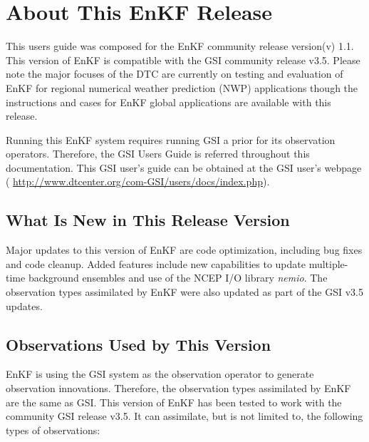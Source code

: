 \section{About This EnKF Release}

This user\textquotesingle s guide was composed for the EnKF community release version(v) 1.1. This version of EnKF is compatible with the GSI community release v3.5. Please note the major focuses of the DTC are currently on testing and evaluation of EnKF for regional numerical weather prediction (NWP) applications though the instructions and cases for EnKF global applications are available with this release. 


Running this EnKF system requires running GSI a prior for its observation operators. Therefore, the GSI 
User\textquotesingle s Guide is referred throughout this documentation. This GSI user's guide can be obtained at the GSI user's webpage ( \url{http://www.dtcenter.org/com-GSI/users/docs/index.php}).

\subsection{What Is New in This Release Version}

Major updates to this version of EnKF are code optimization, including bug fixes and code cleanup. Added features include new capabilities to update multiple-time background ensembles and use of the NCEP I/O library \textit {nemio}. The observation types assimilated by EnKF were also updated as part of the GSI v3.5 updates.

\subsection{Observations Used by This Version }
EnKF is using the GSI system as the observation operator to generate observation innovations. Therefore, the observation types assimilated by EnKF are the same as GSI. This version of EnKF has been tested to work with the community GSI release v3.5. It can assimilate, but is not limited to, the following types of observations:

